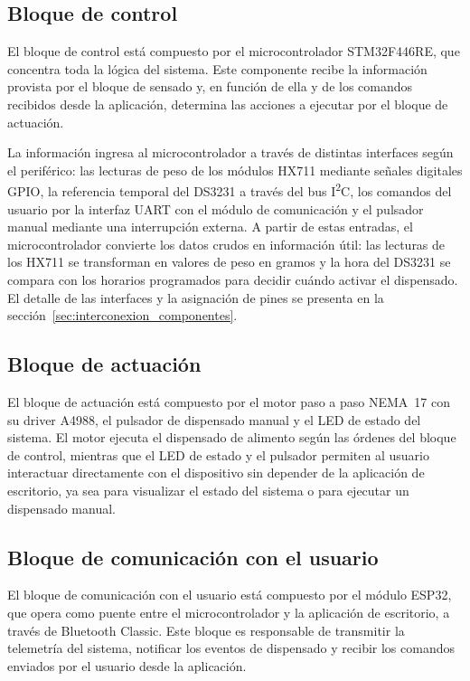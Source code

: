 \subsection{Bloque de control}

El bloque de control está compuesto por el microcontrolador STM32F446RE, que concentra toda la lógica del sistema. Este componente recibe la información provista por el bloque de sensado y, en función de ella y de los comandos recibidos desde la aplicación, determina las acciones a ejecutar por el bloque de actuación.

La información ingresa al microcontrolador a través de distintas interfaces según
el periférico: las lecturas de peso de los módulos HX711 mediante señales digitales
GPIO, la referencia temporal del DS3231 a través del bus I\textsuperscript{2}C, los
comandos del usuario por la interfaz UART con el módulo de comunicación y el
pulsador manual mediante una interrupción externa. A partir de estas entradas, el
microcontrolador convierte los datos crudos en información útil: las lecturas de los
HX711 se transforman en valores de peso en gramos y la hora del DS3231 se compara
con los horarios programados para decidir cuándo activar el dispensado. El detalle
de las interfaces y la asignación de pines se presenta en la
sección~\ref{sec:interconexion_componentes}.

\subsection{Bloque de actuación}

El bloque de actuación está compuesto por el motor paso a paso NEMA~17 con su driver A4988, el pulsador de dispensado manual y el LED de estado del sistema. El motor ejecuta el dispensado de alimento según las órdenes del bloque de control, mientras que el LED de estado y el pulsador permiten al usuario interactuar directamente con el dispositivo sin depender de la aplicación de escritorio, ya sea para visualizar el estado del sistema o para ejecutar un dispensado manual.

\subsection{Bloque de comunicación con el usuario}

El bloque de comunicación con el usuario está compuesto por el módulo ESP32, que opera como puente entre el microcontrolador y la aplicación de escritorio, a través de Bluetooth Classic. Este bloque es responsable de transmitir la telemetría del sistema, notificar los eventos de dispensado y recibir los comandos enviados por el usuario desde la aplicación.

